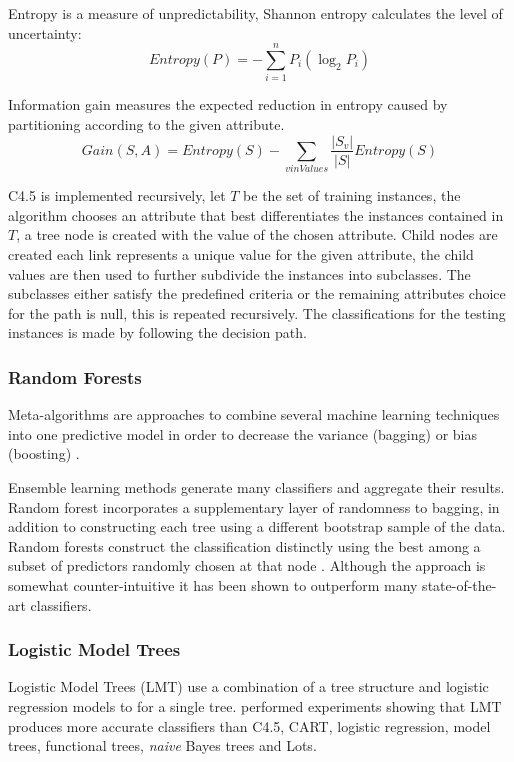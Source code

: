 \documentclass{cmppgr}
\begin{document}
Entropy is a measure of unpredictability, Shannon entropy calculates the level of uncertainty:
$$Entropy(P) = -\sum_{i=1}^{n}P_i(\log_2P_i)$$

Information gain measures the expected reduction in entropy caused by partitioning according to the given attribute.
$$Gain(S,A)=Entropy(S)- \sum_{v in Values}^{}\frac{|S_v|}{|S|}Entropy(S)$$

C4.5 is implemented recursively, let $T$ be the set of training instances, the algorithm chooses an attribute that best differentiates the instances contained in $T$, a tree node is created with the value of the chosen attribute. Child nodes are created each link represents a unique value for the given attribute, the child values are then used to further subdivide the instances into subclasses. The subclasses either satisfy the predefined criteria or the remaining attributes choice for the path is null, this is repeated recursively. The classifications for the testing instances is made by following the decision path.

\subsubsection{Random Forests}
Meta-algorithms are approaches to combine several machine learning techniques into one predictive model in order to decrease the variance (bagging) or bias (boosting) \cite{galkin}. 


Ensemble learning methods generate many classifiers and aggregate their results. Random forest incorporates a supplementary layer of randomness to bagging, in addition to constructing each tree using a different bootstrap sample of the data.
Random forests construct the classification distinctly using the best among a subset of predictors randomly chosen at that node \cite{liaw2002classification}. Although the approach is somewhat counter-intuitive it has been shown to outperform many state-of-the-art classifiers.


\subsubsection{Logistic Model Trees}
Logistic Model Trees (LMT) use a combination of a tree structure and logistic regression models to for a single tree. \cite{landwehr2005logistic} performed experiments showing that LMT produces more accurate classifiers than C4.5, CART, logistic regression, model trees, functional trees, \textit{naive} Bayes trees and Lots.
\end{document}
